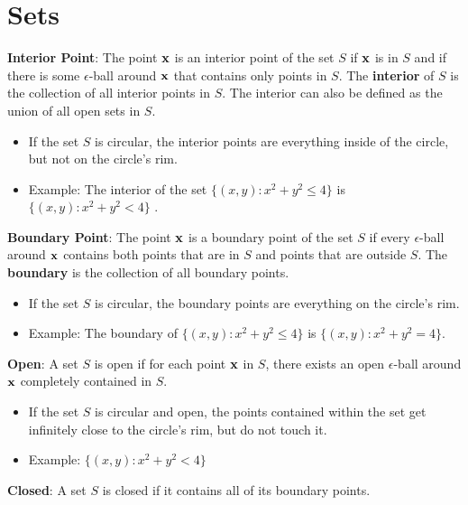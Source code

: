 \documentclass[]{book}
\providecommand{\tightlist}{%
  \setlength{\itemsep}{0pt}\setlength{\parskip}{0pt}}
\theoremstyle{definition}
\theoremstyle{definition}
\theoremstyle{definition}
\theoremstyle{remark}
\begin{document}
\hypertarget{sets}{%
\section{Sets}\label{sets}}

\textbf{Interior Point}: The point \(\bf x\) is an interior point of the set \(S\) if \(\bf x\) is in \(S\) and if there is some \(\epsilon\)-ball around \(\bf x\) that contains only points in \(S\). The \textbf{interior} of \(S\) is the collection of all interior points in \(S\). The interior can also be defined as the union of all open sets in \(S\).

\begin{itemize}
\tightlist
\item
  If the set \(S\) is circular, the interior points are everything inside of the circle, but not on the circle's rim.
\item
  Example: The interior of the set \(\{ (x,y) : x^2+y^2\le 4 \}\) is \(\{ (x,y) : x^2+y^2< 4 \}\) .
\end{itemize}

\textbf{Boundary Point}: The point \(\bf x\) is a boundary point of the set \(S\) if every \(\epsilon\)-ball around \(\bf x\) contains both points that are in \(S\) and points that are outside \(S\). The \textbf{boundary} is the collection of all boundary points.

\begin{itemize}
\tightlist
\item
  If the set \(S\) is circular, the boundary points are everything on the circle's rim.
\item
  Example: The boundary of \(\{ (x,y) : x^2+y^2\le 4 \}\) is \(\{ (x,y) : x^2+y^2 = 4 \}\).
\end{itemize}

\textbf{Open}: A set \(S\) is open if for each point \(\bf x\) in \(S\), there exists an open \(\epsilon\)-ball around \(\bf x\) completely contained in \(S\).

\begin{itemize}
\tightlist
\item
  If the set \(S\) is circular and open, the points contained within the set get infinitely close to the circle's rim, but do not touch it.
\item
  Example: \(\{ (x,y) : x^2+y^2<4 \}\)
\end{itemize}

\textbf{Closed}: A set \(S\) is closed if it contains all of its boundary points.
\end{document}
